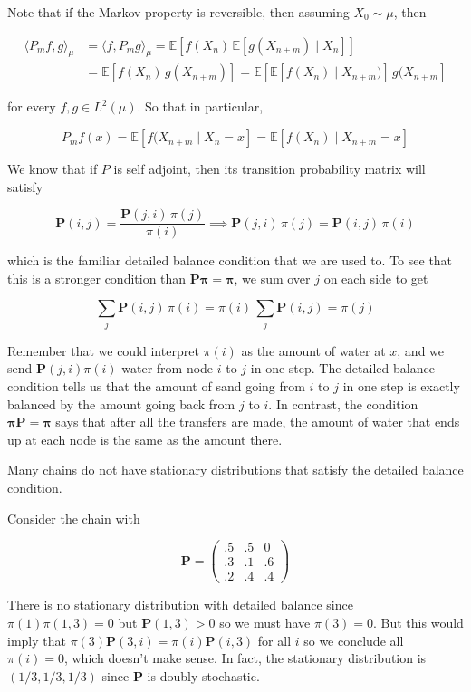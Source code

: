 \documentclass{article}
\begin{document}
    Note that if the Markov property is reversible, then assuming $X_0 \sim \mu$, then 

    \begin{align*}
      \langle P_m f, g \rangle_\mu & = \langle f, P_m g \rangle_\mu = \mathbb{E}[ f(X_n) \, \mathbb{E}[g(X_{n + m}) \mid X_n]] \\
      & = \mathbb{E}[ f(X_n) \, g(X_{n + m})] = \mathbb{E}[ \mathbb{E}[ f(X_n) \mid X_{n + m})] \, g(X_{n + m}] 
    \end{align*}

    for every $f, g \in L^2 (\mu)$. So that in particular, 

      \[P_m f (x) = \mathbb{E}[f(X_{n + m} \mid X_n = x] = \mathbb{E}[f(X_n) \mid X_{n + m} = x]\]

    \begin{example}
      We know that if $P$ is self adjoint, then its transition probability matrix will satisfy 

        \[\mathbf{P}(i, j) = \frac{\mathbf{P}(j, i) \, \pi(j)}{\pi(i)} \implies \mathbf{P}(j, i) \, \pi(j) = \mathbf{P}(i, j) \, \pi(i)\]

      which is the familiar detailed balance condition that we are used to. To see that this is a stronger condition than $\mathbf{P} \boldsymbol{\pi} = \boldsymbol{\pi}$, we sum over $j$ on each side to get 

        \[\sum_j \mathbf{P}(i, j) \, \pi(i) = \pi(i) \, \sum_j \mathbf{P}(i, j) = \pi(j)\]

      Remember that we could interpret $\pi(i)$ as the amount of water at $x$, and we send $\mathbf{P}(j, i) \pi(i)$ water from node $i$ to $j$ in one step. The detailed balance condition tells us that the amount of sand going from $i$ to $j$ in one step is exactly balanced by the amount going back from $j$ to $i$. In contrast, the condition $\boldsymbol{\pi} \mathbf{P} = \boldsymbol{\pi}$ says that after all the transfers are made, the amount of water that ends up at each node is the same as the amount there. 
    \end{example}

    Many chains do not have stationary distributions that satisfy the detailed balance condition. 

    \begin{example}
      Consider the chain with 

        \[\mathbf{P} = \begin{pmatrix} .5 & .5 & 0 \\ .3 & .1 & .6 \\ .2 & .4 & .4 \end{pmatrix}\]

      There is no stationary distribution with detailed balance since $\pi(1) \pi(1, 3) = 0$ but $\mathbf{P}(1, 3) > 0$ so we must have $\pi(3) = 0$. But this would imply that $\pi(3) \mathbf{P}(3, i) = \pi(i) \mathbf{P}(i, 3)$ for all $i$ so we conclude all $\pi(i) = 0$, which doesn't make sense. In fact, the stationary distribution is $(1/3, 1/3, 1/3)$ since $\mathbf{P}$ is doubly stochastic. 
    \end{example}
\end{document}
